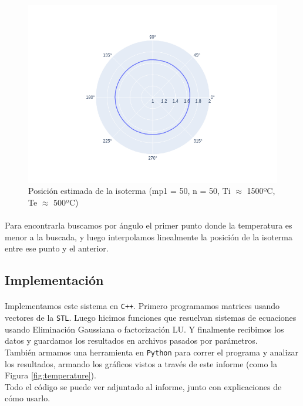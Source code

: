 \documentclass[12pt]{article}
\begin{document}
\begin{figure}[H]
\centering
\includegraphics[scale=0.5]{complete.0.isotherm}
\caption{Posición estimada de la isoterma (mp1 = 50, n = 50, Ti \(\approx\) 1500ºC, Te \(\approx\) 500ºC)}
\label{fig:isotherm.pos}
\end{figure}

\paragraph{} Para encontrarla buscamos por ángulo el primer punto donde la temperatura es menor a la buscada, y luego interpolamos linealmente la posición de la isoterma entre ese punto y el anterior.

\subsection{Implementación}

\paragraph{} Implementamos este sistema en \texttt{C++}. Primero programamos matrices usando vectores de la \texttt{STL}. Luego hicimos funciones que resuelvan sistemas de ecuaciones usando Eliminación Gaussiana o factorización LU. Y finalmente recibimos los datos y guardamos los resultados en archivos pasados por parámetros. \\
También armamos una herramienta en \texttt{Python} para correr el programa y analizar los resultados, armando los gráficos vistos a través de este informe (como la Figura \ref{fig:temperature}). \\
Todo el código se puede ver adjuntado al informe, junto con explicaciones de cómo usarlo. \\
\end{document}
